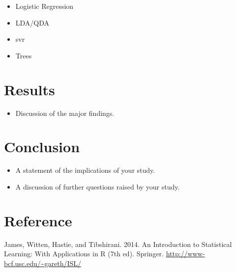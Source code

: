 \documentclass[12pt]{article} %
\begin{document}
\begin{itemize}
\item Logistic Regression
\item LDA/QDA
\item svr
\item Trees
\end{itemize}



\section{Results}

\begin{itemize}
\item Discussion of the major findings.
\end{itemize}


\section{Conclusion}

\begin{itemize}
\item A statement of the implications of your study.
\item A discussion of further questions raised by your study.
\end{itemize}




\section{Reference}

James, Witten, Hastie, and Tibshirani. 2014. An Introduction to Statistical Learning: With Applications in R (7th ed). Springer. \url{http://www-bcf.usc.edu/~gareth/ISL/}

\end{document}
